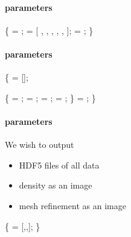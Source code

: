 
 \begin{frame}[fragile] 
 \secframetitle{\ssDoubleMach}
 \framesubtitle{ parameters}
\footnotesize
% 
% 
\begin{semiverbatim}
 \{
    = ;
    = [
      ,        
      ,
      ,
      ,
      ,
       ];
    = ; 
\}
\end{semiverbatim}
\end{frame}


 \begin{frame}[fragile] 
 \secframetitle{\ssDoubleMach}
 \framesubtitle{ parameters}
\footnotesize
\begin{semiverbatim}
 \{
    = [];

    \{
         = ;
        = ;
        = ;
       = ;
   \}
      = ;
\}
\end{semiverbatim}
\end{frame}


 \begin{frame}[fragile] 
 \secframetitle{\ssDoubleMach}
 \framesubtitle{ parameters}
We wish to output
\begin{itemize}
\item HDF5 files of all data
\item density as an image
\item mesh refinement as an image
\end{itemize}

\begin{semiverbatim}
 \{ 
    = [,,];
\}
\end{semiverbatim}
\end{frame}

